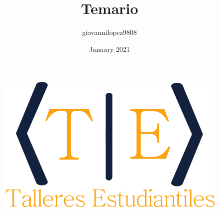 \documentclass[12pt,letterpaper]{article}
\title{Temario}
\author{giovannilopez9808 }
\date{January 2021}
\begin{document}
\begin{figure}[H]
    \begin{flushright}
        \includegraphics[scale=0.25]{../images/logo.png}
    \end{flushright}
\end{figure}
\vspace{-5cm}
\end{document}
